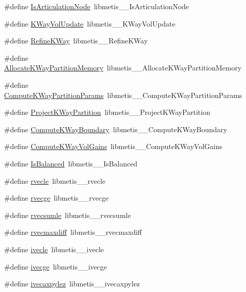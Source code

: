 \begin{DoxyCompactItemize}
\item 
\#define \hyperlink{a00957_afd2a46989d883fbf2341e740c5212a24}{Is\+Articulation\+Node}~libmetis\+\_\+\+\_\+\+Is\+Articulation\+Node
\item 
\#define \hyperlink{a00957_a31276fe4249713085402cd39a9172e48}{K\+Way\+Vol\+Update}~libmetis\+\_\+\+\_\+\+K\+Way\+Vol\+Update
\item 
\#define \hyperlink{a00957_ad43f76c31fa2b626a0cf43fad91c100f}{Refine\+K\+Way}~libmetis\+\_\+\+\_\+\+Refine\+K\+Way
\item 
\#define \hyperlink{a00957_a92425a62a2971b391b53b775d04e4912}{Allocate\+K\+Way\+Partition\+Memory}~libmetis\+\_\+\+\_\+\+Allocate\+K\+Way\+Partition\+Memory
\item 
\#define \hyperlink{a00957_a878bfc45273c77f17ac5759a2ed32d6c}{Compute\+K\+Way\+Partition\+Params}~libmetis\+\_\+\+\_\+\+Compute\+K\+Way\+Partition\+Params
\item 
\#define \hyperlink{a00957_ae9f12d0ced22ca6eacbff9ef582fe199}{Project\+K\+Way\+Partition}~libmetis\+\_\+\+\_\+\+Project\+K\+Way\+Partition
\item 
\#define \hyperlink{a00957_adc6275bdca4827a199ff7f2fbf39dea5}{Compute\+K\+Way\+Boundary}~libmetis\+\_\+\+\_\+\+Compute\+K\+Way\+Boundary
\item 
\#define \hyperlink{a00957_a0ca69b7ab3036e51b901fb5804abbeae}{Compute\+K\+Way\+Vol\+Gains}~libmetis\+\_\+\+\_\+\+Compute\+K\+Way\+Vol\+Gains
\item 
\#define \hyperlink{a00957_a68893c829436f87813107dfbe768f765}{Is\+Balanced}~libmetis\+\_\+\+\_\+\+Is\+Balanced
\item 
\#define \hyperlink{a00957_a6b19362cf0bbf183d52e10fc9d779f7a}{rvecle}~libmetis\+\_\+\+\_\+rvecle
\item 
\#define \hyperlink{a00957_aeab7205876f995edff3f6c25cfe3ebc4}{rvecge}~libmetis\+\_\+\+\_\+rvecge
\item 
\#define \hyperlink{a00957_aa39df0a0f36ce813b161712c991e631d}{rvecsumle}~libmetis\+\_\+\+\_\+rvecsumle
\item 
\#define \hyperlink{a00957_ab22b3729c0cb33044953d433352e88f4}{rvecmaxdiff}~libmetis\+\_\+\+\_\+rvecmaxdiff
\item 
\#define \hyperlink{a00957_abd6c0abf20834dbd66bfe196758e2e34}{ivecle}~libmetis\+\_\+\+\_\+ivecle
\item 
\#define \hyperlink{a00957_af616d5852cb86576610cd891191e6eb8}{ivecge}~libmetis\+\_\+\+\_\+ivecge
\item 
\#define \hyperlink{a00957_a6dd5a3a97f7168c276daed7fabd63aa8}{ivecaxpylez}~libmetis\+\_\+\+\_\+ivecaxpylez

\end{DoxyCompactItemize}
